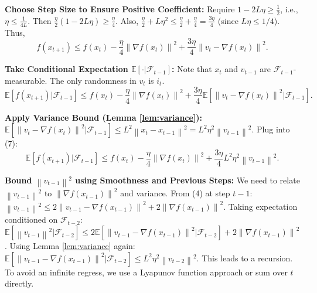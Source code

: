 \documentclass{article}
\newcommand{\E}{\mathbb{E}}
\newcommand{\norm}[1]{\left\| #1 \right\|}
\newcommand{\grad}{\nabla}
\newcommand{\step}[1]{\text{\color{blue}[Step #1]}}
\begin{document}
\step{6} \textbf{Choose Step Size to Ensure Positive Coefficient:}
Require $1 - 2 L \eta \ge \frac{1}{2}$, i.e., $\eta \le \frac{1}{4L}$. Then $\frac{\eta}{2}(1-2L\eta) \ge \frac{\eta}{4}$.
Also, $\frac{\eta}{2} + L \eta^2 \le \frac{\eta}{2} + \frac{\eta}{4} = \frac{3\eta}{4}$ (since $L\eta \le 1/4$).
Thus,
\begin{equation}
    f(x_{t+1}) \le f(x_t) - \frac{\eta}{4} \norm{\grad f(x_t)}^2 + \frac{3\eta}{4} \norm{v_t - \grad f(x_t)}^2. \tag{6}
\end{equation}

\step{7} \textbf{Take Conditional Expectation $\E[\cdot | \mathcal{F}_{t-1}]$:}
Note that $x_t$ and $v_{t-1}$ are $\mathcal{F}_{t-1}$-measurable. The only randomness in $v_t$ is $i_t$.
\begin{equation}
    \E[ f(x_{t+1}) | \mathcal{F}_{t-1} ] \le f(x_t) - \frac{\eta}{4} \norm{\grad f(x_t)}^2 + \frac{3\eta}{4} \E[ \norm{v_t - \grad f(x_t)}^2 | \mathcal{F}_{t-1} ]. \tag{7}
\end{equation}

\step{8} \textbf{Apply Variance Bound (Lemma \ref{lem:variance}):}
$\E[ \norm{v_t - \grad f(x_t)}^2 | \mathcal{F}_{t-1} ] \le L^2 \norm{x_t - x_{t-1}}^2 = L^2 \eta^2 \norm{v_{t-1}}^2$.
Plug into (7):
\begin{equation}
    \E[ f(x_{t+1}) | \mathcal{F}_{t-1} ] \le f(x_t) - \frac{\eta}{4} \norm{\grad f(x_t)}^2 + \frac{3\eta}{4} L^2 \eta^2 \norm{v_{t-1}}^2. \tag{8}
\end{equation}

\step{9} \textbf{Bound $\norm{v_{t-1}}^2$ using Smoothness and Previous Steps:}
We need to relate $\norm{v_{t-1}}^2$ to $\norm{\grad f(x_{t-1})}^2$ and variance.
From (4) at step $t-1$: $\norm{v_{t-1}}^2 \le 2 \norm{v_{t-1} - \grad f(x_{t-1})}^2 + 2 \norm{\grad f(x_{t-1})}^2$.
Taking expectation conditioned on $\mathcal{F}_{t-2}$:
$\E[ \norm{v_{t-1}}^2 | \mathcal{F}_{t-2} ] \le 2 \E[ \norm{v_{t-1} - \grad f(x_{t-1})}^2 | \mathcal{F}_{t-2} ] + 2 \norm{\grad f(x_{t-1})}^2$.
Using Lemma \ref{lem:variance} again: $\E[ \norm{v_{t-1} - \grad f(x_{t-1})}^2 | \mathcal{F}_{t-2} ] \le L^2 \eta^2 \norm{v_{t-2}}^2$.
This leads to a recursion. To avoid an infinite regress, we use a Lyapunov function approach or sum over $t$ directly.
\end{document}

